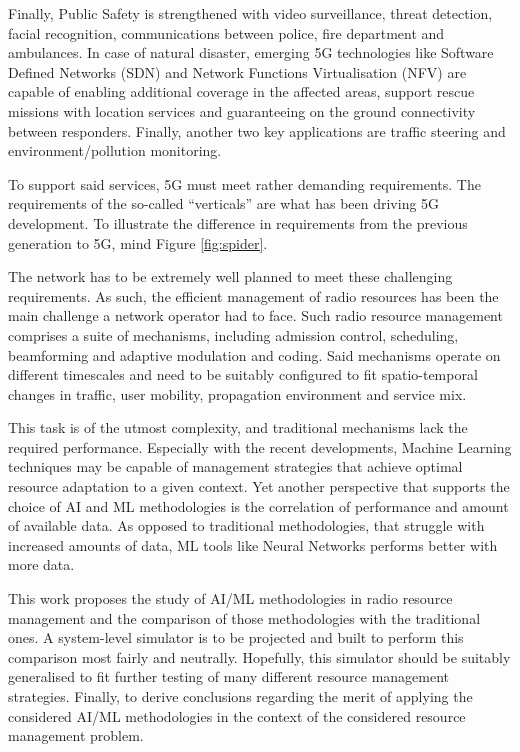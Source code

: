 \begin{itemize}
 Finally, Public Safety is strengthened with video surveillance, threat detection, facial recognition, communications between police, fire department and ambulances. In case of natural disaster, emerging 5G technologies like Software Defined Networks (SDN) and Network Functions Virtualisation (NFV) are capable of enabling additional coverage in the affected areas, support rescue missions with location services and guaranteeing on the ground connectivity between responders.
 Finally, another two key applications are traffic steering and environment/pollution monitoring.
\end{itemize}

To support said services, \ac{5G} must meet rather demanding requirements. The requirements of the so-called ``verticals'' are what has been driving 5G development. To illustrate the difference in requirements from the previous generation to \ac{5G}, mind Figure \ref{fig:spider}.


The network has to be extremely well planned to meet these challenging requirements. As such, the efficient management of radio resources has been the main challenge a network operator had to face. Such radio resource management comprises a suite of mechanisms, including admission control, scheduling, beamforming and adaptive modulation and coding. Said mechanisms operate on different timescales and need to be suitably configured to fit spatio-temporal changes in traffic, user mobility, propagation environment and service mix.

This task is of the utmost complexity, and traditional mechanisms lack the required performance. Especially with the recent developments, Machine Learning techniques may be capable of management strategies that achieve optimal resource adaptation to a given context. Yet another perspective that supports the choice of \ac{AI} and \ac{ML} methodologies is the correlation of performance and amount of available data. As opposed to traditional methodologies, that struggle with increased amounts of data, \ac{ML} tools like Neural Networks performs better with more data.


This work proposes the study of AI/ML methodologies in radio resource management and the comparison of those methodologies with the traditional ones. A system-level simulator is to be projected and built to perform this comparison most fairly and neutrally. Hopefully, this simulator should be suitably generalised to fit further testing of many different resource management strategies. Finally, to derive conclusions regarding the merit of applying the considered AI/ML methodologies in the context of the considered resource management problem.


